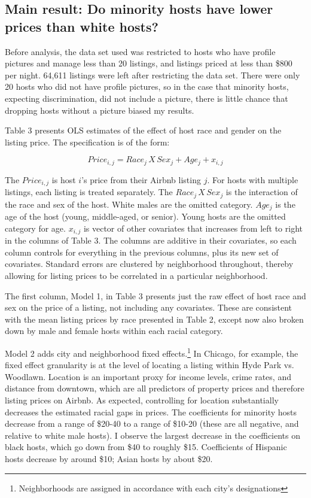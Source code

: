 \subsection{Main result: Do minority hosts have lower prices than white hosts?} %

Before analysis, the data set used was restricted to hosts who have profile pictures and manage less than 20 listings, and listings priced at less than \$800 per night. 64,611 listings were left after restricting the data set. There were only 20 hosts who did not have profile pictures, so in the case that minority hosts, expecting discrimination, did not include a picture, there is little chance that dropping hosts without a picture biased my results. 

Table 3 presents OLS estimates of the effect of host race and gender on the listing price. The specification is of the form: 

\[ Price_{i,j} = Race_{j}\,X \,Sex_j + Age_j + x_{i,j}\]

The $Price_{i,j}$ is host $i$'s price from their Airbnb listing $j$. For hosts with multiple listings, each listing is treated separately. The $Race_{j}\,X \,Sex_j$ is the interaction of the race and sex of the host. White males are the omitted category. $Age_j$ is the age of the host (young, middle-aged, or senior). Young hosts are the omitted category for age. $x_{i,j}$ is vector of other covariates that increases from left to right in the columns of Table 3. The columns are additive in their covariates, so each column controls for everything in the previous columns, plus its new set of covariates. Standard errors are clustered by neighborhood throughout, thereby allowing for listing prices to be correlated in a particular neighborhood.

The first column, Model 1, in Table 3 presents just the raw effect of host race and sex on the price of a listing, not including any covariates. These are consistent with the mean listing prices by race presented in Table 2, except now also broken down by male and female hosts within each racial category.

Model 2 adds city and neighborhood fixed effects.\footnote{Neighborhoods are assigned in accordance with each city's designations} In Chicago, for example, the fixed effect granularity is at the level of locating a listing within Hyde Park vs. Woodlawn. Location is an important proxy for income levels, crime rates, and distance from downtown, which are all predictors of property prices and therefore listing prices on Airbnb. As expected, controlling for location substantially decreases the estimated racial gaps in prices. The coefficients for minority hosts decrease from a range of \$20-40 to a range of \$10-20 (these are all negative, and relative to white male hosts). I observe the largest decrease in the coefficients on black hosts, which go down from \$40 to roughly \$15. Coefficients of Hispanic hosts decrease by around \$10; Asian hosts by about \$20. 

